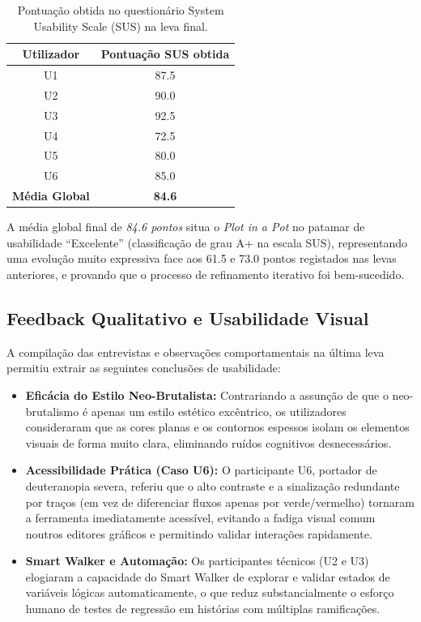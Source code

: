 \begin{table}[!htbp]
\centering
\caption{Pontuação obtida no questionário System Usability Scale (SUS) na leva final.}
\label{tab:pontuacao-sus}
\begin{tabular}{cc}
\toprule
\textbf{Utilizador} & \textbf{Pontuação SUS obtida} \\
\midrule
U1 & 87.5 \\
U2 & 90.0 \\
U3 & 92.5 \\
U4 & 72.5 \\
U5 & 80.0 \\
U6 & 85.0 \\
\midrule
\textbf{Média Global} & \textbf{84.6} \\
\bottomrule
\end{tabular}
\end{table}

A média global final de \textit{84.6 pontos} situa o \textit{Plot in a Pot} no patamar de usabilidade ``Excelente'' (classificação de grau A+ na escala SUS), representando uma evolução muito expressiva face aos 61.5 e 73.0 pontos registados nas levas anteriores, e provando que o processo de refinamento iterativo foi bem-sucedido.

\subsection{Feedback Qualitativo e Usabilidade Visual}
A compilação das entrevistas e observações comportamentais na última leva permitiu extrair as seguintes conclusões de usabilidade:
\begin{itemize}
    \item \textbf{Eficácia do Estilo Neo-Brutalista:} Contrariando a assunção de que o neo-brutalismo é apenas um estilo estético excêntrico, os utilizadores consideraram que as cores planas e os contornos espessos isolam os elementos visuais de forma muito clara, eliminando ruídos cognitivos desnecessários.
    \item \textbf{Acessibilidade Prática (Caso U6):} O participante U6, portador de deuteranopia severa, referiu que o alto contraste e a sinalização redundante por traços (em vez de diferenciar fluxos apenas por verde/vermelho) tornaram a ferramenta imediatamente acessível, evitando a fadiga visual comum noutros editores gráficos e permitindo validar interações rapidamente.
    \item \textbf{Smart Walker e Automação:} Os participantes técnicos (U2 e U3) elogiaram a capacidade do Smart Walker de explorar e validar estados de variáveis lógicas automaticamente, o que reduz substancialmente o esforço humano de testes de regressão em histórias com múltiplas ramificações.
\end{itemize}

